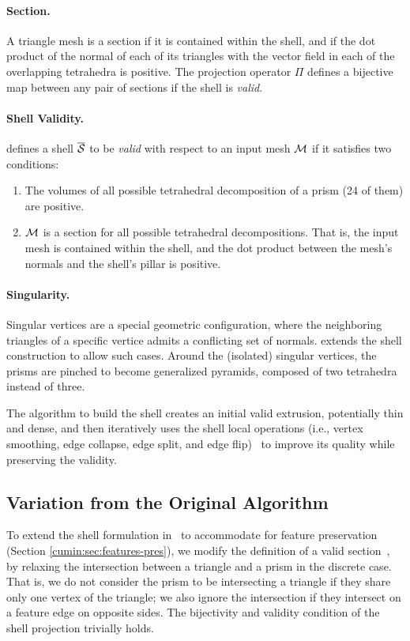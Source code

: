 \paragraph{Section.} A triangle mesh is a section if it is contained within the shell, and if the dot product of the normal of each of its triangles with the vector field in each of the overlapping tetrahedra is positive. The projection operator $\Pi$ defines a bijective map between any pair of sections if the shell is \emph{valid}.

\paragraph{Shell Validity.}
\cite{jiang2020bijective} defines a shell $\overline{\mathcal{S}}$ to be \emph{valid} with respect to an input mesh $\mathcal{M}$ if it satisfies two conditions:
\begin{enumerate}
    \item The volumes of all possible tetrahedral decomposition of a prism (24 of them) are positive.
    \item $\mathcal{M}$ is a section for all possible tetrahedral decompositions. That is, the input mesh is contained within the shell, and the dot product between the mesh's normals and the shell's pillar is positive. 
\end{enumerate}

\paragraph{Singularity.}
Singular vertices are a special geometric configuration, where the neighboring triangles of a specific {vertice} admits {a} conflicting set of normals. 
\cite{jiang2020bijective} extends the shell construction to allow such cases. Around the (isolated) singular vertices, the prisms are pinched to become generalized pyramids, composed of two tetrahedra instead of three.


The algorithm to build the shell creates an initial valid extrusion, potentially thin and dense, and then iteratively uses the shell local operations (i.e., vertex smoothing, edge collapse, edge split, and edge flip)~\cite[Section 3.4]{jiang2020bijective} to improve its quality while preserving the validity.


\subsection{Variation from the Original Algorithm}
To extend the shell formulation in~\cite{jiang2020bijective} to accommodate for feature preservation (Section \ref{cumin:sec:features-pres}), we modify the definition of a valid section~\cite[Definition 3.1]{jiang2020bijective}, by relaxing the intersection between a triangle and a prism in the discrete case. That is, we do not consider the prism to be intersecting a triangle if they share only one vertex of the triangle; we also ignore the intersection if they intersect on a feature edge on opposite sides. The bijectivity and validity condition of the shell projection trivially holds.

